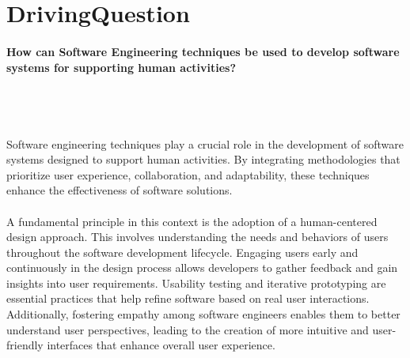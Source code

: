 \section{DrivingQuestion}


\paragraph{How can Software Engineering techniques be used to develop software systems for supporting human activities?}
\\
\noindent
\\
\\
Software engineering techniques play a crucial role in the development of software systems designed to support human activities. By integrating methodologies that prioritize user experience, collaboration, and adaptability, these techniques enhance the effectiveness of software solutions.
\\
\noindent
\\
A fundamental principle in this context is the adoption of a human-centered design approach. This involves understanding the needs and behaviors of users throughout the software development lifecycle. Engaging users early and continuously in the design process allows developers to gather feedback and gain insights into user requirements. Usability testing and iterative prototyping are essential practices that help refine software based on real user interactions. Additionally, fostering empathy among software engineers enables them to better understand user perspectives, leading to the creation of more intuitive and user-friendly interfaces that enhance overall user experience.
